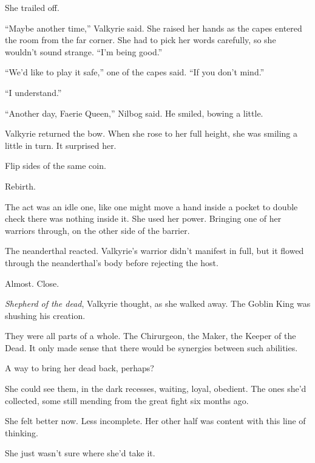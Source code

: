 She trailed off.



``Maybe another time,'' Valkyrie said.  She raised her hands as the capes entered the room from the far corner.  She had to pick her words carefully, so she wouldn't sound strange.  ``I'm being good.''



``We'd like to play it safe,'' one of the capes said.  ``If you don't mind.''



``I understand.''



``Another day, Faerie Queen,'' Nilbog said.  He smiled, bowing a little.



Valkyrie returned the bow.  When she rose to her full height, she was smiling a little in turn.  It surprised her.



Flip sides of the same coin.



Rebirth.



The act was an idle one, like one might move a hand inside a pocket to double check there was nothing inside it.  She used her power.  Bringing one of her warriors through, on the other side of the barrier.



The neanderthal reacted.  Valkyrie's warrior didn't manifest in full, but it flowed through the neanderthal's body before rejecting the host.



Almost.  Close.



\emph{Shepherd of the dead}, Valkyrie thought, as she walked away.  The Goblin King was shushing his creation.



They were all parts of a whole.  The Chirurgeon, the Maker, the Keeper of the Dead.  It only made sense that there would be synergies between such abilities.



A way to bring her dead back, perhaps?



She could see them, in the dark recesses, waiting, loyal, obedient.  The ones she'd collected, some still mending from the great fight six months ago.



She felt better now.  Less incomplete.  Her other half was content with this line of thinking.



She just wasn't sure where she'd take it.





